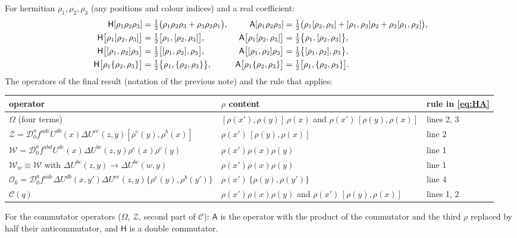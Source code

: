 \documentclass[10pt]{article}
\numberwithin{equation}{section}
\begin{document}
For hermitian $\rho_{1},\rho_{2},\rho_{3}$ (any positions and colour indices) and a real coefficient:
\begin{align}
\mathsf{H}[\rho_{1}\rho_{2}\rho_{3}]&=\tfrac12\big(\rho_{1}\rho_{2}\rho_{3}+\rho_{3}\rho_{2}\rho_{1}\big), &
\mathsf{A}[\rho_{1}\rho_{2}\rho_{3}]&=\tfrac12\big(\rho_{1}[\rho_{2},\rho_{3}]+[\rho_{1},\rho_{3}]\rho_{2}+\rho_{3}[\rho_{1},\rho_{2}]\big),\notag\\
\mathsf{H}\big[\rho_{1}[\rho_{2},\rho_{3}]\big]&=\tfrac12\big[\rho_{1},[\rho_{2},\rho_{3}]\big], &
\mathsf{A}\big[\rho_{1}[\rho_{2},\rho_{3}]\big]&=\tfrac12\big\{\rho_{1},[\rho_{2},\rho_{3}]\big\},\notag\\
\mathsf{H}\big[[\rho_{1},\rho_{2}]\rho_{3}\big]&=\tfrac12\big[[\rho_{1},\rho_{2}],\rho_{3}\big], &
\mathsf{A}\big[[\rho_{1},\rho_{2}]\rho_{3}\big]&=\tfrac12\big\{[\rho_{1},\rho_{2}],\rho_{3}\big\},\notag\\
\mathsf{H}\big[\rho_{1}\{\rho_{2},\rho_{3}\}\big]&=\tfrac12\big\{\rho_{1},\{\rho_{2},\rho_{3}\}\big\}, &
\mathsf{A}\big[\rho_{1}\{\rho_{2},\rho_{3}\}\big]&=\tfrac12\big[\rho_{1},\{\rho_{2},\rho_{3}\}\big]. \label{eq:HA}
\end{align}
The operators of the final result (notation of the previous note) and the rule that applies:
\begin{center}
\renewcommand{\arraystretch}{1.35}
\begin{tabular}{l|l|l}
operator & $\rho$ content & rule in \eqref{eq:HA}\\ \hline
$\Omega$ (four terms) & $[\rho(x'),\rho(y)]\,\rho(x)$ and $\rho(x')\,[\rho(y),\rho(x)]$ & lines 2, 3\\
$\mathcal{Z}=\mathcal{D}_{0}^{a}f^{adc}U^{db}(x)\Delta U^{ce}(z,y)[\rho^{e}(y),\rho^{b}(x)]$ & $\rho(x')\,[\rho(y),\rho(x)]$ & line 2\\
$\mathcal{W}=\mathcal{D}_{0}^{a}f^{abd}U^{de}(x)\Delta U^{bc}(z,y)\rho^{e}(x)\rho^{c}(y)$ & $\rho(x')\rho(x)\rho(y)$ & line 1\\
$\mathcal{W}_{w}\equiv\mathcal{W}$ with $\Delta U^{bc}(z,y)\to\Delta U^{bc}(w,y)$ & $\rho(x')\rho(x)\rho(y)$ & line 1\\
$\mathcal{O}_{6}=\mathcal{D}_{0}^{a}f^{adc}\Delta U^{db}(x,y')\Delta U^{ce}(z,y)\{\rho^{e}(y),\rho^{b}(y')\}$ & $\rho(x')\,\{\rho(y),\rho(y')\}$ & line 4\\
$\mathcal{C}(q)$ & $\rho(x')\rho(x)\rho(y)$ and $\rho(x')\,[\rho(y),\rho(x)]$ & lines 1, 2
\end{tabular}
\end{center}
For the commutator operators ($\Omega$, $\mathcal{Z}$, second part of $\mathcal{C}$): $\mathsf{A}$ is the operator with the product of the commutator and the third $\rho$ replaced by half their anticommutator, and $\mathsf{H}$ is a double commutator.
\end{document}
